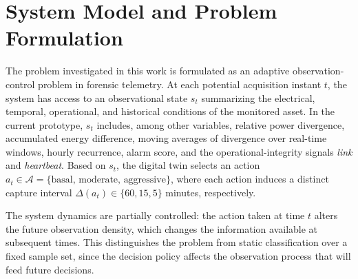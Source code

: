 \documentclass{ieeeaccess}
\begin{document}
\section{System Model and Problem Formulation}
\label{sec:system_model}
The problem investigated in this work is formulated as an adaptive observation-control problem in forensic telemetry. At each potential acquisition instant $t$, the system has access to an observational state $s_t$ summarizing the electrical, temporal, operational, and historical conditions of the monitored asset. In the current prototype, $s_t$ includes, among other variables, relative power divergence, accumulated energy difference, moving averages of divergence over real-time windows, hourly recurrence, alarm score, and the operational-integrity signals \textit{link} and \textit{heartbeat}. Based on $s_t$, the digital twin selects an action $a_t \in \mathcal{A} = \{\text{basal},\, \text{moderate},\, \text{aggressive}\}$, where each action induces a distinct capture interval $\Delta(a_t) \in \{60, 15, 5\}$ minutes, respectively.

The system dynamics are partially controlled: the action taken at time $t$ alters the future observation density, which changes the information available at subsequent times. This distinguishes the problem from static classification over a fixed sample set, since the decision policy affects the observation process that will feed future decisions.
\end{document}
